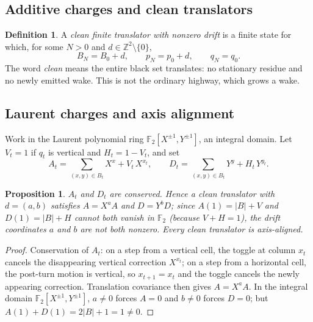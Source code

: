 \documentclass[11pt,letterpaper]{article}
\theoremstyle{plain}
\newtheorem{proposition}[theorem]{Proposition}
\theoremstyle{definition}
\newtheorem{definition}[theorem]{Definition}
\newcommand{\Z}{\mathbb{Z}}
\newcommand{\F}{\mathbb{F}}
\newcommand{\drift}{d}
\begin{document}
\begin{NoHyper}
\section{Additive charges and clean translators}\label{sec:charges}

\begin{definition}\label{def:translator}
A \emph{clean finite translator with nonzero drift} is a finite state for which, for
some $N>0$ and $\drift\in\Z^2\setminus\{0\}$,
\[
B_N=B_0+\drift,\qquad p_N=p_0+\drift,\qquad q_N=q_0 .
\]
The word \emph{clean} means the entire black set translates: no stationary residue
and no newly emitted wake. This is not the ordinary highway, which grows a wake.
\end{definition}

\subsection{Laurent charges and axis alignment}
Work in the Laurent polynomial ring $\F_2[X^{\pm1},Y^{\pm1}]$, an integral domain.
Let $V_t=1$ if $q_t$ is vertical and $H_t=1-V_t$, and set
\[
A_t=\sum_{(x,y)\in B_t}X^x+V_t\,X^{x_t},\qquad
D_t=\sum_{(x,y)\in B_t}Y^y+H_t\,Y^{y_t}.
\]

\begin{proposition}\label{prop:laurent}
$A_t$ and $D_t$ are conserved. Hence a clean translator with $\drift=(a,b)$ satisfies
$A=X^aA$ and $D=Y^bD$; since $A(1)=|B|+V$ and $D(1)=|B|+H$ cannot both vanish in
$\F_2$ (because $V+H=1$), the drift coordinates $a$ and $b$ are not both nonzero.
Every clean translator is axis-aligned.
\end{proposition}

\begin{proof}
Conservation of $A_t$: on a step from a vertical cell, the toggle at column $x_t$
cancels the disappearing vertical correction $X^{x_t}$; on a step from a horizontal
cell, the post-turn motion is vertical, so $x_{t+1}=x_t$ and the toggle cancels the
newly appearing correction. Translation covariance then gives $A=X^aA$. In the
integral domain $\F_2[X^{\pm1},Y^{\pm1}]$, $a\neq0$ forces $A=0$ and $b\neq0$ forces
$D=0$; but $A(1)+D(1)=2|B|+1=1\neq0$.
\end{proof}


\end{NoHyper}
\end{document}

